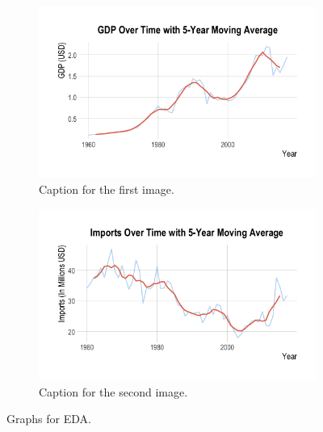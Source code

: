 \documentclass[11pt]{article}
\begin{document}
\begin{figure}[htbp]
  \label{fig:side-by-side}

  \begin{subfigure}[b]{0.48\textwidth}
    \centering
    \includegraphics[width=\linewidth]{EDA/GDP_MA5.png} %
    \caption{Caption for the first image.}
    \label{fig:side:a}
  \end{subfigure}
  \hfill
  \begin{subfigure}[b]{0.48\textwidth}
    \centering
    \includegraphics[width=\linewidth]{EDA/Imports_MA5.png} %
    \caption{Caption for the second image.}
    \label{fig:side:b}
  \end{subfigure}

  \caption{Graphs for EDA.}
\end{figure}
\end{document}
